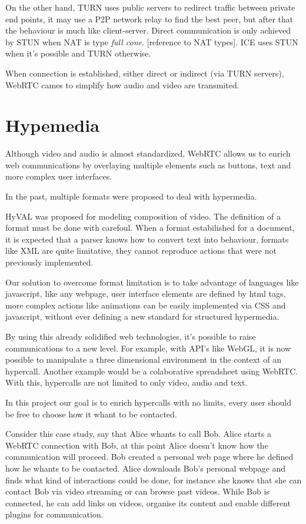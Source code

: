 \documentclass[11pt,twocolumn]{article}
\begin{document}
On the other hand, TURN uses public servers to redirect traffic between private end points, it may use a P2P network relay to find the best peer, but after that the behaviour is much like client-server. Direct communication is only achieved by STUN when NAT is type \textit{full cone}. {\color{red} [reference to NAT types]}. ICE uses STUN when it's possible and TURN otherwise.

When connection is established, either direct or indirect (via TURN servers), WebRTC cames to simplify how audio and video are transmited. 

\section{Hypemedia}

Although video and audio is almost standardized, WebRTC allows us to enrich web communications by overlaying multiple elements such as buttons, text and more complex user interfaces.

In the past, multiple formats were proposed to deal with hypermedia.

HyVAL\cite{hyval} was proposed for modeling composition of video. The definition of a format must be done with carefoul. When a format estabilished for a document, it is expected that a parser knows how to convert text into behaviour, formats like XML are quite limitative, they cannot reproduce actions that were not previously implemented.

Our solution to overcome format limitation is to take advantage of languages like javascript, like any webpage, user interface elements are defined by html tags, more complex actions like animations can be easily implemented via CSS and javascript, without ever defining a new standard for structured hypermedia.

By using this already solidified web technologies, it's possible to raise communications to a new level. For example, with API's like WebGL, it is now possible to manipulate a three dimensional environment in the context of an hypercall. Another example would be a colaborative spreadsheet using WebRTC. With this, hypercalls are not limited to only video, audio and text.


In this project our goal is to enrich hypercalls with no limits, every user should be free to choose how it whant to be contacted. 

Consider this case study, say that Alice whants to call Bob. Alice starts a WebRTC connection with Bob, at this point Alice doesn't know how the communication will proceed. Bob created a personal web page where he defined how he whants to be contacted. Alice downloads Bob's personal webpage and finds what kind of interactions could be done, for instance she knows that she can contact Bob via video streaming or can browse past videos. While Bob is connected, he can add links on videos, organise its content and enable different plugins for communication.
\end{document}

